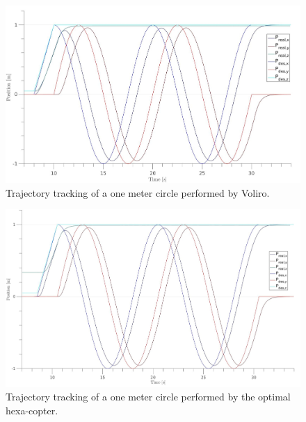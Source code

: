 \begin{figure}[!ht]
  \begin{center}
    \includegraphics[width=1.0\linewidth]{images/Voliro_circle_position.jpg}
    \caption{Trajectory tracking of a one meter circle performed by Voliro.}
    \label{fig:Voliro_position_circle}
  \end{center}
\end{figure}

\begin{figure}[!ht]
  \begin{center}
    \includegraphics[width=1.0\linewidth]{images/Hexa_circle_position.jpg}
    \caption{Trajectory tracking of a one meter circle performed by the optimal hexa-copter.}
    \label{fig:Hexa_position_circle}
  \end{center}
\end{figure}

